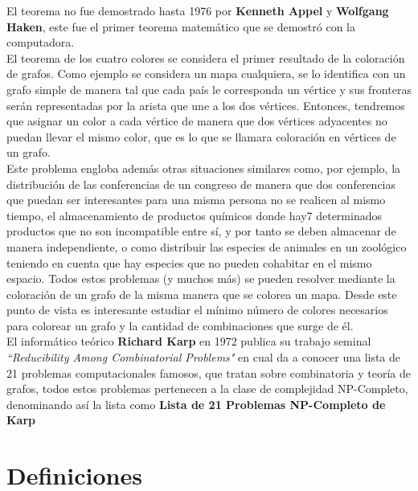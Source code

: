 \documentclass[12pt]{report}
\begin{document}
El teorema no fue demostrado hasta 1976 por \textbf{Kenneth Appel} y \textbf{Wolfgang Haken}, este fue el primer teorema matemático que se demostró con la computadora. %
\\El teorema de los cuatro colores se considera el primer resultado de la coloración de grafos. Como ejemplo se considera un mapa cualquiera, se lo identifica con un grafo simple de manera tal que cada país le corresponda un vértice y sus fronteras serán representadas por la arista que une a los dos vértices. Entonces, tendremos que asignar un color a cada vértice de manera que dos vértices adyacentes no puedan llevar el mismo color, que es lo que se llamara coloración en vértices de un grafo.\\
Este problema engloba además otras situaciones similares como, por ejemplo, la distribución de las conferencias de un congreso de manera que dos conferencias que puedan ser interesantes para una misma persona no se realicen al mismo tiempo, el almacenamiento de productos químicos donde hay7 determinados productos que no son incompatible entre sí, y por tanto se deben almacenar de manera independiente, o como distribuir las especies de animales en un zoológico teniendo en cuenta que hay especies que no pueden cohabitar en el mismo espacio. Todos estos problemas (y muchos más) se pueden resolver mediante la coloración de un grafo de la misma manera que se colorea un mapa. Desde este punto de vista es interesante estudiar el mínimo número de colores necesarios para colorear un grafo y la cantidad de combinaciones que surge de él.\\
El informático teórico \textbf{Richard Karp} en 1972 publica su trabajo seminal \textsl{``Reducibility Among Combinatorial Problems"} en cual da a conocer una lista de 21 problemas computacionales famosos, que tratan sobre combinatoria y teoría de grafos, todos estos problemas pertenecen a la clase de complejidad NP-Completo, denominando así la lista como \textbf{Lista de 21 Problemas NP-Completo de Karp}

\section{Definiciones}
\end{document}

